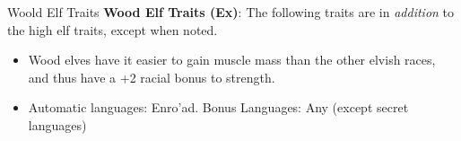 \begin{35e}{Woold Elf Traits}
  \textbf{Wood Elf Traits (Ex)}: The following traits are in \emph{addition}
  to the high elf traits, except when noted.
  \begin{itemize}[noitemsep]
    \item Wood elves have it easier to gain muscle mass than the other elvish
      races, and thus have a +2 racial bonus to strength.
    \item Automatic languages: Enro'ad. Bonus Languages: Any (except secret
      languages)
  \end{itemize}
\end{35e}
